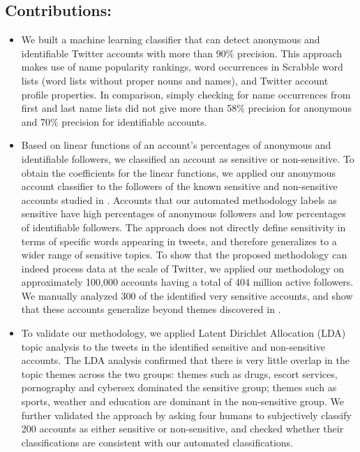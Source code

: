 \documentclass[conference]{IEEEtran}
\begin{document}
\subsection*{Contributions:}
\begin{itemize}
\item 
We built a machine learning classifier that can detect anonymous and identifiable Twitter accounts with more than 90\% precision. This approach makes use of name 
popularity rankings, word occurrences in Scrabble word lists (word lists  without proper nouns and names), and Twitter account profile properties. In comparison, simply checking for name occurrences from first and last name lists did not give more than 58\% precision for anonymous and 70\% precision for identifiable accounts.  
\item 
Based on linear functions of an account's percentages of anonymous and identifiable followers, we classified an account as sensitive or non-sensitive. To obtain the coefficients for the linear functions, we applied our anonymous account classifier to the followers of the known sensitive and non-sensitive accounts  studied in \cite{PeddintiCOSN2014}.
Accounts that our automated methodology labels as sensitive have high percentages of anonymous followers and  low percentages of identifiable followers. The approach does not directly define sensitivity in terms of specific words appearing in tweets, and therefore generalizes to a wider range of sensitive topics. To show that the proposed methodology can indeed process data at the scale of Twitter, we applied our methodology on  approximately 100,000 accounts having a total of 404 million active followers.   We manually analyzed 300 of the identified very sensitive accounts, and show that these accounts generalize beyond themes discovered in \cite{PeddintiCOSN2014}.
\item 
To validate our methodology, we applied Latent Dirichlet Allocation (LDA) topic analysis to  the tweets in the identified sensitive and non-sensitive accounts. The LDA analysis confirmed that there is very little overlap in the topic themes across the two groups: themes such as drugs, escort services, pornography and cybersex dominated the sensitive group; themes such as sports, weather and education are dominant in the non-sensitive group. We further validated the approach by  
asking four humans to subjectively classify 200 accounts as either sensitive or non-sensitive, and checked whether their classifications are consistent with our automated classifications. 
\end{itemize}
\end{document}
